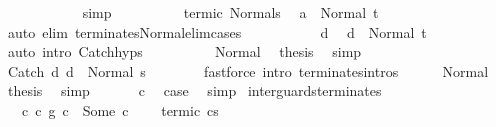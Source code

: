\begin{isabellebody}
\ \ \ \ \ \ \ \ \ \ \isamarkupfalse%
\ simp\isanewline
\ \ \ \ \ \ \ \ \isamarkupfalse%
\ termi{\isacharunderscore}c{}\ Normal{\isacharunderscore}s\ \isamarkupfalse%
\ {\isachardoublequoteopen}{\isasymGamma}{\isasymturnstile}a{}\ {\isasymdown}\ Normal\ t{\isachardoublequoteclose}\isanewline
\ \ \ \ \ \ \ \ \ \ \isamarkupfalse%
\ {\isacharparenleft}auto\ elim{\isacharcolon}\ terminates{\isacharunderscore}Normal{\isacharunderscore}elim{\isacharunderscore}cases{\isacharparenright}\ \isanewline
\ \ \ \ \ \ \ \ \isamarkupfalse%
\ d{}\ \isamarkupfalse%
\ {\isachardoublequoteopen}{\isasymGamma}{\isasymturnstile}d{}\ {\isasymdown}\ Normal\ t{\isachardoublequoteclose}\isanewline
\ \ \ \ \ \ \ \ \ \ \isamarkupfalse%
\ {\isacharparenleft}auto\ intro{\isacharcolon}\ Catch{\isachardot}hyps{\isacharparenright}\isanewline
\ \ \ \ \ \ \ \ \isamarkupfalse%
\ Normal\ \isamarkupfalse%
\ {\isacharquery}thesis\ \isamarkupfalse%
\ simp\ \ \isanewline
\ \ \ \ \ \ \isamarkupfalse%
\isanewline
\ \ \ \ \isacommand{{\isacharbraceright}}\isamarkupfalse%
\isanewline
\ \ \ \ \isamarkupfalse%
\ \isamarkupfalse%
\ {\isachardoublequoteopen}{\isasymGamma}{\isasymturnstile}Catch\ d{}\ d{}\ {\isasymdown}\ Normal\ s{\isacharprime}{\isachardoublequoteclose}\isanewline
\ \ \ \ \ \ \isamarkupfalse%
\ {\isacharparenleft}fastforce\ intro{\isacharcolon}\ terminates{\isachardot}intros{\isacharparenright}\isanewline
\ \ \ \ \isamarkupfalse%
\ Normal\ \isamarkupfalse%
\ {\isacharquery}thesis\ \isamarkupfalse%
\ simp\isanewline
\ \ \isamarkupfalse%
\isanewline
\ \ \isamarkupfalse%
\ c\ \isamarkupfalse%
\ {\isacharquery}case\ \isamarkupfalse%
\ simp\isanewline
{}\isamarkupfalse%
%
\endisatagproof
{\isafoldproof}%
%
\isadelimproof
\isanewline
%
\endisadelimproof
\isanewline
{}\isamarkupfalse%
\ inter{\isacharunderscore}guards{\isacharunderscore}terminates{\isacharprime}{\isacharcolon}\ \isanewline
\ \ \ c{\isacharcolon}\ {\isachardoublequoteopen}{\isacharparenleft}c{}\ {\isasyminter}\isactrlsub g\ c{}{\isacharparenright}\ {\isacharequal}\ Some\ c{\isachardoublequoteclose}\ \isanewline
\ \ \ termi{\isacharunderscore}c{}{\isacharcolon}\ {\isachardoublequoteopen}{\isasymGamma}{\isasymturnstile}c{}{\isasymdown}s{\isachardoublequoteclose}\isanewline

\end{isabellebody}
